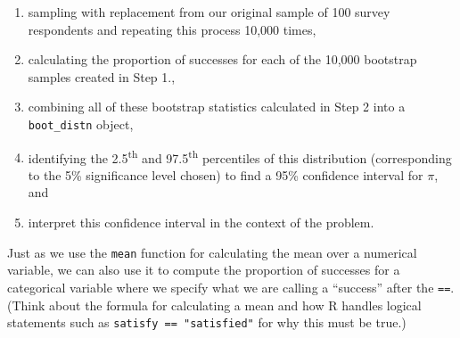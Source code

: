 \documentclass[12pt, krantz2,]{krantz}
\makeatletter
\newenvironment{Shaded}{\begin{snugshade}}{\end{snugshade}}
\newcommand{\DataTypeTok}[1]{\textcolor[rgb]{0.27,0.27,0.27}{#1}}
\newcommand{\DecValTok}[1]{\textcolor[rgb]{0.06,0.06,0.06}{#1}}
\newcommand{\KeywordTok}[1]{\textcolor[rgb]{0.27,0.27,0.27}{\textbf{#1}}}
\newcommand{\NormalTok}[1]{#1}
\newcommand{\OperatorTok}[1]{\textcolor[rgb]{0.43,0.43,0.43}{\textbf{#1}}}
\newcommand{\StringTok}[1]{\textcolor[rgb]{0.5,0.5,0.5}{#1}}
\providecommand{\tightlist}{%
  \setlength{\itemsep}{0pt}\setlength{\parskip}{0pt}}
\newenvironment{kframe}{%
\medskip{}
\setlength{\fboxsep}{.8em}
 \def\at@end@of@kframe{}%
 \ifinner\ifhmode%
  \def\at@end@of@kframe{\end{minipage}}%
  \begin{minipage}{\columnwidth}%
 \fi\fi%
 \def\FrameCommand##1{\hskip\@totalleftmargin \hskip-\fboxsep
 \colorbox{shadecolor}{##1}\hskip-\fboxsep
     \hskip-\linewidth \hskip-\@totalleftmargin \hskip\columnwidth}%
 \MakeFramed {\advance\hsize-\width
   \@totalleftmargin\z@ \linewidth\hsize
   \@setminipage}}%
 {\par\unskip\endMakeFramed%
 \at@end@of@kframe}
\renewenvironment{Shaded}{\begin{kframe}}{\end{kframe}}
\makeatother
\begin{document}
\begin{enumerate}
\def\labelenumi{\arabic{enumi}.}
\tightlist
\item
  sampling with replacement from our original sample of 100 survey respondents and repeating this process 10,000 times,
\item
  calculating the proportion of successes for each of the 10,000 bootstrap samples created in Step 1.,
\item
  combining all of these bootstrap statistics calculated in Step 2 into a \texttt{boot\_distn} object,
\item
  identifying the 2.5\textsuperscript{th} and 97.5\textsuperscript{th} percentiles of this distribution (corresponding to the 5\% significance level chosen) to find a 95\% confidence interval for \(\pi\), and
\item
  interpret this confidence interval in the context of the problem.
\end{enumerate}

\begin{Shaded}
\end{Shaded}

Just as we use the \texttt{mean} function for calculating the mean over a numerical variable, we can also use it to compute the proportion of successes for a categorical variable where we specify what we are calling a ``success'' after the \texttt{==}. (Think about the formula for calculating a mean and how R handles logical statements such as \texttt{satisfy\ ==\ "satisfied"} for why this must be true.)

\begin{Shaded}
\end{Shaded}
\end{document}
